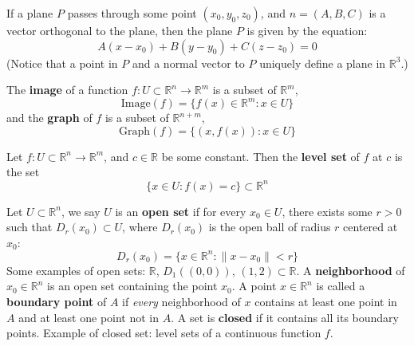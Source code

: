 \documentclass[openany]{book}
\newcommand{\R}{\mathbb{R}}
\begin{document}
\begin{defn}[Plane in $\R^3$]\label{plane}
   If a plane ${P}$ passes through some point $(x_0,y_0,z_0)$, and $n=(A,B,C)$ is a vector orthogonal to the plane, then the plane ${P}$ is given by the equation:
    \begin{equation*}
        A(x-x_0)+B(y-y_0)+C(z-z_0)=0
    \end{equation*}
    (Notice that a point in ${P}$ and a normal vector to ${P}$ uniquely define a plane in $\R^3$.)
\end{defn}


\begin{defn}
    The \textbf{image} of a function $f: U\subset\R^n\to\R^m$ is a subset of $\R^m$,
    \begin{equation*}
        \text{Image}(f)=\{f(x)\in\R^m: x\in U\}
    \end{equation*}
    and the \textbf{graph} of $f$ is a subset of $\R^{n+m}$,
    \begin{equation*}
        \text{Graph}(f)=\{(x,f(x)): x\in U\}
    \end{equation*}
\end{defn}


\begin{defn}
    Let $f:U\subset\R^n\to\R^m$, and $c\in\R$ be some constant. Then the \textbf{level set} of $f$ at $c$ is the set 
    \begin{equation*}
        \{x\in U: f(x)=c\}\subset\R^n
    \end{equation*}
\end{defn}

\begin{defn}
    Let $U\subset\R^n$, we say $U$ is an \textbf{open set} if for every $x_0\in U$, there exists some $r>0$ such that $D_r(x_0)\subset U$, where $D_r(x_0)$ is the open ball of radius $r$ centered at $x_0$:
    \begin{equation*}
        D_r(x_0)=\{x\in\R^n: \|x-x_0\|<r\}
    \end{equation*}
    Some examples of open sets: $\R$, $D_{1}((0,0))$, $(1,2)\subset\R$.
    A \textbf{neighborhood} of $x_0\in\R^n$ is an open set containing the point $x_0$. A point $x\in\R^n$ is called a \textbf{boundary point} of $A$ if \textit{every} neighborhood of $x$ contains at least one point in $A$ and at least one point not in $A$. A set is \textbf{closed} if it contains all its boundary points. Example of closed set: level sets of a continuous function $f$.
\end{defn}
\end{document}
